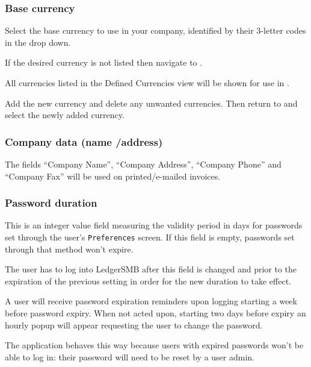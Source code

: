 \subsubsection{Base currency}
\label{subsubsec-company-config-defaults-currencies}

Select the base currency
to use in your company, identified by their 3-letter codes in the drop down. 

If the desired currency is not listed then navigate to .

All currencies listed in the Defined Currencies view will be shown for use in \lsmb.

Add the new currency and delete any unwanted currencies. Then return to  and select the newly added currency.

\subsubsection{Company data (name /address)}
\label{subsubsec-company-config-defaults-name-address}

The fields ``Company Name'', ``Company Address'',
``Company Phone'' and ``Company Fax'' will be used on printed/e-mailed invoices.

\subsubsection{Password duration}
\label{subsubsec-company-config-defaults-password-duration}

This is an integer value field measuring the validity period in days for passwords set through
the user's \texttt{Preferences} screen. If this field is empty, passwords set through that method
won't expire.

The user has to log into LedgerSMB after this field is changed and prior to the expiration of the previous setting in order for the new duration to take effect.

A user will receive password  expiration reminders upon logging starting a week before password
expiry. When not acted upon, starting two days before expiry an hourly popup will appear
requesting the user to change the password.

The application behaves this way because users with expired passwords won't be able to log in:
their password will need to be reset by a user admin.

